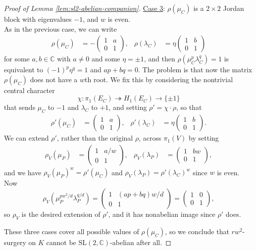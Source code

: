 \documentclass[11pt]{amsart}
\numberwithin{equation}{section}
\numberwithin{theorem}{section}
\theoremstyle{definition}
\newcommand{\C}{\mathbb{C}}
\newcommand\SL{\mathrm{SL}}
\begin{document}
\begin{proof}[Proof of Lemma \ref{lem:sl2-abelian-companion}]
\vspace{1em}\noindent
\underline{Case 3}: $\rho(\mu_C)$ is a $2\times 2$ Jordan block with eigenvalues $-1$, and $w$ is even.\\

As in the previous case, we can write
\begin{align*}
\rho(\mu_C) &= -\begin{pmatrix} 1 & a \\ 0 & 1 \end{pmatrix}, &
\rho(\lambda_C) &= \eta \begin{pmatrix} 1 & b \\ 0 & 1 \end{pmatrix}
\end{align*}
for some $a,b\in\C$ with $a\neq 0$ and some $\eta=\pm1$, and then $\rho(\mu_C^p\lambda_C^q)=1$ is equivalent to $(-1)^p\eta^q=1$ and $ap+bq=0$.  The problem is that now the matrix $\rho(\mu_C)$ does not have a $w$th root.  We fix this by considering the nontrivial central character
\[ \chi: \pi_1(E_C) \twoheadrightarrow H_1(E_C) \to \{\pm1\} \]
that sends $\mu_C$ to $-1$ and $\lambda_C$ to $+1$, and setting $\rho' = \chi\cdot\rho$, so that
\begin{align*}
\rho'(\mu_C) &= \begin{pmatrix} 1 & a \\ 0 & 1 \end{pmatrix}, &
\rho'(\lambda_C) &= \eta \begin{pmatrix} 1 & b \\ 0 & 1 \end{pmatrix}.
\end{align*}
We can extend $\rho'$, rather than the original $\rho$, across $\pi_1(V)$ by setting
\begin{align*}
\rho_V(\mu_P) &= \begin{pmatrix} 1 & a/w \\ 0 & 1 \end{pmatrix}, &
\rho_V(\lambda_P) &= \begin{pmatrix} 1 & bw \\ 0 & 1 \end{pmatrix},
\end{align*}
and we have $\rho_V(\mu_P)^w = \rho'(\mu_C)$ and $\rho_V(\lambda_P) = \rho'(\lambda_C)^w$ since $w$ is even.  Now 
\[ \rho_V(\mu_P^{pw^2/d}\lambda_P^{q/d}) = \begin{pmatrix} 1 & (ap+bq)w/d \\ 0 & 1 \end{pmatrix} = \begin{pmatrix} 1 & 0 \\ 0 & 1 \end{pmatrix}, \]
so $\rho_V$ is the desired extension of $\rho'$, and it has nonabelian image since $\rho'$ does.

\vspace{1em}These three cases cover all possible values of $\rho(\mu_C)$, so we conclude that $rw^2$-surgery on $K$ cannot be $\SL(2,\C)$-abelian after all.
\end{proof}
\end{document}
